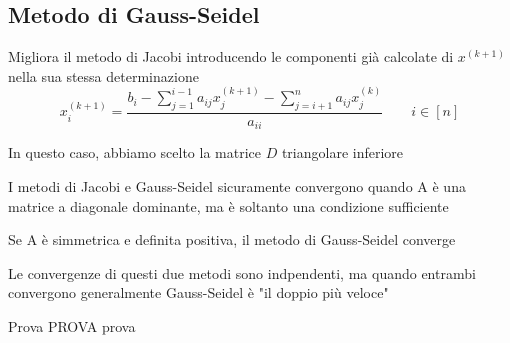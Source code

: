 \documentclass[openany]{book}
\begin{document}
\subsection{Metodo di Gauss-Seidel}

Migliora il metodo di Jacobi introducendo le componenti già calcolate di $x^{(k+1)}$ nella sua stessa determinazione
\[ \displaystyle x_i^{(k+1)}=\frac{b_i-\displaystyle\sum_{j=1}^{i-1}a_{ij}x_j^{(k+1)}-\displaystyle\sum^n_{j=i+1}a_{ij}x_j^{(k)}}{a_{ii}} \qquad i\in[n] \]

In questo caso, abbiamo scelto la matrice $D$ triangolare inferiore

I metodi di Jacobi e Gauss-Seidel sicuramente convergono quando A è una matrice a diagonale dominante, ma è soltanto una condizione sufficiente

Se A è simmetrica e definita positiva, il metodo di Gauss-Seidel converge

Le convergenze di questi due metodi sono indpendenti, ma quando entrambi convergono generalmente Gauss-Seidel è "il doppio più veloce"


Prova PROVA prova
\end{document}
